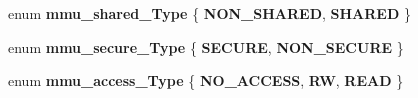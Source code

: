 \begin{DoxyCompactItemize}
\item 
enum {\bfseries mmu\+\_\+shared\+\_\+\+Type} \{ {\bfseries N\+O\+N\+\_\+\+S\+H\+A\+R\+ED}, 
{\bfseries S\+H\+A\+R\+ED}
 \}\hypertarget{group__MMU__Functions_gab884a11fa8d094573ab77fb1c0f8d8a7}{}\label{group__MMU__Functions_gab884a11fa8d094573ab77fb1c0f8d8a7}

\item 
enum {\bfseries mmu\+\_\+secure\+\_\+\+Type} \{ {\bfseries S\+E\+C\+U\+RE}, 
{\bfseries N\+O\+N\+\_\+\+S\+E\+C\+U\+RE}
 \}\hypertarget{group__MMU__Functions_gac3d277641df9fb3bb3b555e2e79dd639}{}\label{group__MMU__Functions_gac3d277641df9fb3bb3b555e2e79dd639}

\item 
enum {\bfseries mmu\+\_\+access\+\_\+\+Type} \{ {\bfseries N\+O\+\_\+\+A\+C\+C\+E\+SS}, 
{\bfseries RW}, 
{\bfseries R\+E\+AD}
 \}\hypertarget{group__MMU__Functions_ga2ee598252f996e4f96640b096291d280}{}\label{group__MMU__Functions_ga2ee598252f996e4f96640b096291d280}

\end{DoxyCompactItemize}
